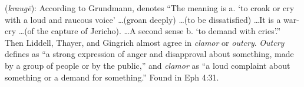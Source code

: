 \item[Clamor,]

(\textit{kraugē}):
According to Grundmann,  denotes ``The meaning is a. `to croak or cry with a loud and raucous voice' \ldots (groan deeply) \ldots (to be dissatisfied) \ldots It is a war-cry \ldots (of the capture of Jericho). \ldots A second sense b. `to demand with cries'.'' Then Liddell, Thayer, and Gingrich almost agree in \emph{clamor} or \emph{outcry}. \emph{Outcry} defines as ``a strong expression of anger and disapproval about something, made by a group of people or by the public,'' and \emph{clamor} as ``a loud complaint about something or a demand for something.''
Found in Eph 4:31.
